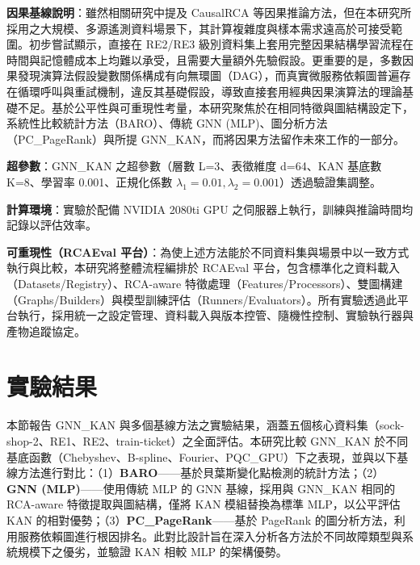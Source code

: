 \documentclass[10pt,a4paper,twocolumn]{article}
\begin{document}
\textbf{因果基線說明}：雖然相關研究中提及 CausalRCA 等因果推論方法，但在本研究所採用之大規模、多源遙測資料場景下，其計算複雜度與樣本需求遠高於可接受範圍。初步嘗試顯示，直接在 RE2/RE3 級別資料集上套用完整因果結構學習流程在時間與記憶體成本上均難以承受，且需要大量額外先驗假設。更重要的是，多數因果發現演算法假設變數關係構成有向無環圖（DAG），而真實微服務依賴圖普遍存在循環呼叫與重試機制，違反其基礎假設，導致直接套用經典因果演算法的理論基礎不足。基於公平性與可重現性考量，本研究聚焦於在相同特徵與圖結構設定下，系統性比較統計方法（BARO）、傳統 GNN (MLP)、圖分析方法（PC\_PageRank）與所提 GNN\_KAN，而將因果方法留作未來工作的一部分。

\textbf{超參數}：GNN\_KAN 之超參數（層數 L=3、表徵維度 d=64、KAN 基底數 K=8、學習率 0.001、正規化係數 $\lambda_1=0.01, \lambda_2=0.001$）透過驗證集調整。

\textbf{計算環境}：實驗於配備 NVIDIA 2080ti GPU 之伺服器上執行，訓練與推論時間均記錄以評估效率。

\textbf{可重現性（RCAEval 平台）}：為使上述方法能於不同資料集與場景中以一致方式執行與比較，本研究將整體流程編排於 RCAEval 平台，包含標準化之資料載入（Datasets/Registry）、RCA-aware 特徵處理（Features/Processors）、雙圖構建（Graphs/Builders）與模型訓練評估（Runners/Evaluators）。所有實驗透過此平台執行，採用統一之設定管理、資料載入與版本控管、隨機性控制、實驗執行器與產物追蹤協定。

\section{實驗結果}

本節報告 GNN\_KAN 與多個基線方法之實驗結果，涵蓋五個核心資料集（sock-shop-2、RE1、RE2、train-ticket）之全面評估。本研究比較 GNN\_KAN 於不同基底函數（Chebyshev、B-spline、Fourier、PQC\_GPU）下之表現，並與以下基線方法進行對比：（1）\textbf{BARO}——基於貝葉斯變化點檢測的統計方法；（2）\textbf{GNN (MLP)}——使用傳統 MLP 的 GNN 基線，採用與 GNN\_KAN 相同的 RCA-aware 特徵提取與圖結構，僅將 KAN 模組替換為標準 MLP，以公平評估 KAN 的相對優勢；（3）\textbf{PC\_PageRank}——基於 PageRank 的圖分析方法，利用服務依賴圖進行根因排名。此對比設計旨在深入分析各方法於不同故障類型與系統規模下之優劣，並驗證 KAN 相較 MLP 的架構優勢。
\end{document}
